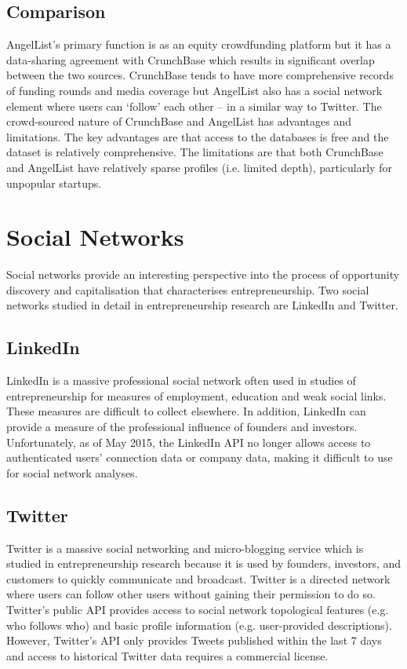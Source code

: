 \subsection{Comparison}

AngelList’s primary function is as an equity crowdfunding platform but it has a data-sharing agreement with CrunchBase which results in significant overlap between the two sources. CrunchBase tends to have more comprehensive records of funding rounds \cite{cheng2016} and media coverage but AngelList also has a social network element where users can `follow’ each other -- in a similar way to Twitter. The crowd-sourced nature of CrunchBase and AngelList has advantages and limitations. The key advantages are that access to the databases is free and the dataset is relatively comprehensive. The limitations are that both CrunchBase and AngelList have relatively sparse profiles (i.e. limited depth), particularly for unpopular startups.

\section{Social Networks}

Social networks provide an interesting perspective into the process of opportunity discovery and capitalisation that characterises entrepreneurship. Two social networks studied in detail in entrepreneurship research are LinkedIn and Twitter.

\subsection{LinkedIn}

LinkedIn is a massive professional social network often used in studies of entrepreneurship for measures of employment, education and weak social links. These measures are difficult to collect elsewhere. In addition, LinkedIn can provide a measure of the professional influence of founders and investors. Unfortunately, as of May 2015, the LinkedIn API no longer allows access to authenticated users' connection data or company data, making it difficult to use for social network analyses.

\subsection{Twitter}

Twitter is a massive social networking and micro-blogging service which is studied in entrepreneurship research because it is used by founders, investors, and customers to quickly communicate and broadcast. Twitter is a directed network where users can follow other users without gaining their permission to do so. Twitter's public API provides access to social network topological features (e.g. who follows who) and basic profile information (e.g. user-provided descriptions). However, Twitter's API only provides Tweets published within the last 7 days and access to historical Twitter data requires a commercial license.


